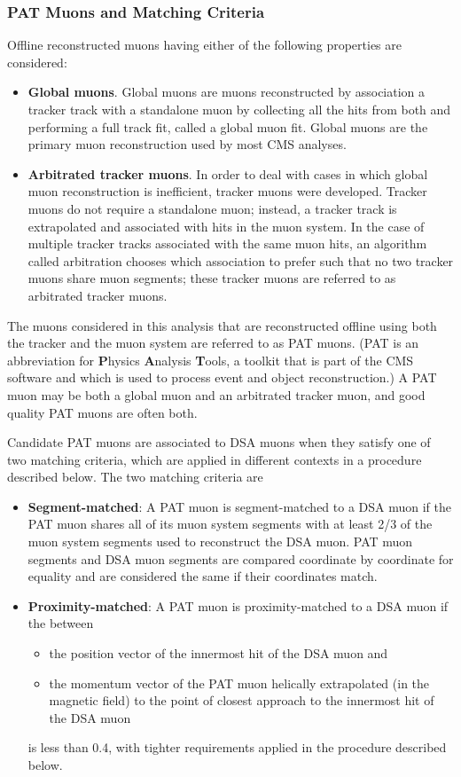 \subsubsection{PAT Muons and Matching Criteria}
Offline reconstructed muons having either of the following properties are considered:
\begin{itemize}
  \item \textbf{Global muons}. Global muons are muons reconstructed by association a tracker track with a standalone muon by collecting all the hits from both and performing a full track fit, called a global muon fit. Global muons are the primary muon reconstruction used by most CMS analyses.
  \item \textbf{Arbitrated tracker muons}. In order to deal with cases in which global muon reconstruction is inefficient, tracker muons were developed. Tracker muons do not require a standalone muon; instead, a tracker track is extrapolated and associated with hits in the muon system. In the case of multiple tracker tracks associated with the same muon hits, an algorithm called arbitration chooses which association to prefer such that no two tracker muons share muon segments; these tracker muons are referred to as arbitrated tracker muons.
\end{itemize}
The muons considered in this analysis that are reconstructed offline using both the tracker and the muon system are referred to as PAT muons.
(PAT is an abbreviation for \textbf{P}hysics \textbf{A}nalysis \textbf{T}ools, a toolkit that is part of the CMS software and which is used to process event and object reconstruction.)
A PAT muon may be both a global muon and an arbitrated tracker muon, and good quality PAT muons are often both.

Candidate PAT muons are associated to DSA muons when they satisfy one of two matching criteria, which are applied in different contexts in a procedure described below. The two matching criteria are
\begin{itemize}
  \item \textbf{Segment-matched}: A PAT muon is segment-matched to a DSA muon if the PAT muon shares all of its muon system segments with at least 2/3 of the muon system segments used to reconstruct the DSA muon. PAT muon segments and DSA muon segments are compared coordinate by coordinate for equality and are considered the same if their coordinates match.
  \item \textbf{Proximity-matched}: A PAT muon is proximity-matched to a DSA muon if the \deltaR between
    \begin{itemize}
      \item the position vector of the innermost hit of the DSA muon and
      \item the momentum vector of the PAT muon helically extrapolated (in the magnetic field) to the point of closest approach to the innermost hit of the DSA muon
    \end{itemize}
    is less than 0.4, with tighter requirements applied in the procedure described below.
\end{itemize}

